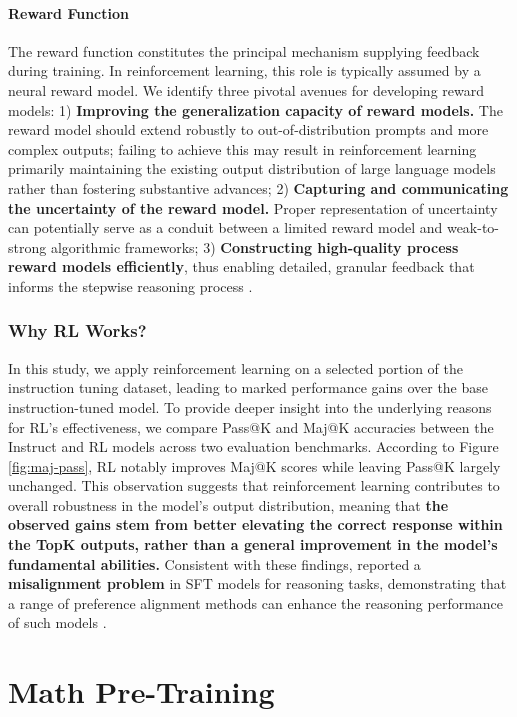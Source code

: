 \begin{itemize}[topsep=0pt]
\paragraph{Reward Function} The reward function constitutes the principal mechanism supplying feedback during training. In reinforcement learning, this role is typically assumed by a neural reward model. We identify three pivotal avenues for developing reward models: 1) \textbf{Improving the generalization capacity of reward models.} The reward model should extend robustly to out-of-distribution prompts and more complex outputs; failing to achieve this may result in reinforcement learning primarily maintaining the existing output distribution of large language models rather than fostering substantive advances; 2) \textbf{Capturing and communicating the uncertainty of the reward model.} Proper representation of uncertainty can potentially serve as a conduit between a limited reward model and weak-to-strong algorithmic frameworks; 3) \textbf{Constructing high-quality process reward models efficiently}, thus enabling detailed, granular feedback that informs the stepwise reasoning process \citep{lightman2023let,wang2023math}.

\subsubsection{Why RL Works?}  
In this study, we apply reinforcement learning on a selected portion of the instruction tuning dataset, leading to marked performance gains over the base instruction-tuned model. To provide deeper insight into the underlying reasons for RL's effectiveness, we compare Pass@K and Maj@K accuracies between the Instruct and RL models across two evaluation benchmarks. According to Figure \ref{fig:maj-pass}, RL notably improves Maj@K scores while leaving Pass@K largely unchanged. This observation suggests that reinforcement learning contributes to overall robustness in the model's output distribution, meaning that \textbf{the observed gains stem from better elevating the correct response within the TopK outputs, rather than a general improvement in the model’s fundamental abilities.} Consistent with these findings, \citep{wang2023making} reported a \textbf{misalignment problem} in SFT models for reasoning tasks, demonstrating that a range of preference alignment methods can enhance the reasoning performance of such models \citep{yuan2023rrhf,song2023preference,wang2023making}.

\section{Math Pre-Training}


\end{itemize}
